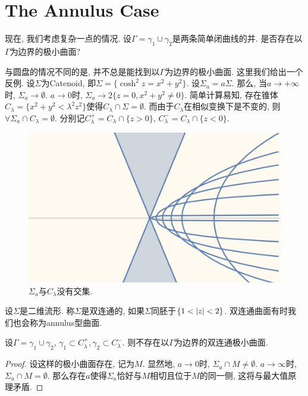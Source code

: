 \section{The Annulus Case}
现在, 我们考虑复杂一点的情况. 设$\Gamma=\gamma_1 \cup \gamma_2$是两条简单闭曲线的并. 是否存在以$\Gamma$为边界的极小曲面?  
\par 与圆盘的情况不同的是,  并不总是能找到以$\Gamma$为边界的极小曲面.  这里我们给出一个反例.  设$\Sigma$为Catenoid, 即$\Sigma=\{\cosh^2 z = x^2+y^2\}$.  设$\Sigma_a= a\Sigma$.  那么, 当$a \to +\infty$时,  $\Sigma_a \to \emptyset$.  $a\to 0$时, $\Sigma_a \to 2\{z=0, x^2+y^2\ne 0\}$.  简单计算易知,  存在锥体$C_\lambda=\{x^2+y^2< \lambda^2z^2\}$使得$C_\lambda\cap \Sigma=\emptyset$.  而由于$C_\lambda$在相似变换下是不变的, 则$\forall \Sigma_a \cap C_\lambda = \emptyset$.  分别记$C^+_\lambda=C_\lambda \cap \{z>0\}$, $C^-_\lambda=C_\lambda \cap \{z<0\}$. 
\begin{figure}[ht]
    \centering
    \includegraphics[scale=0.4]{images/sequence_of_catenoid.png}
    \caption{$\Sigma_a$与$C_\lambda$没有交集.}
    \label{label}
\end{figure}
%
\begin{definition}
    设$\Sigma$是二维流形. 称$\Sigma$是双连通的, 如果$\Sigma$同胚于$\{1< {\left | z \right |}< 2\}$.  双连通曲面有时我们也会称为annulus型曲面.
\end{definition}
\begin{proposition}
    设$\Gamma=\gamma_1 \cup \gamma_2$, $\gamma_1 \subset C^+_\lambda, \gamma_2 \subset C^-_\lambda$. 则不存在以$\Gamma$为边界的双连通极小曲面.
\end{proposition}
\begin{proof}
    设这样的极小曲面存在, 记为$M$.  显然地, $a \to 0$时,  $\Sigma_a \cap M \ne \emptyset$.  $a \to \infty$时, $\Sigma_a \cap M = \emptyset$. 那么存在$a$使得$\Sigma_a$恰好与$M$相切且位于$M$的同一侧, 这将与最大值原理矛盾.
\end{proof}


